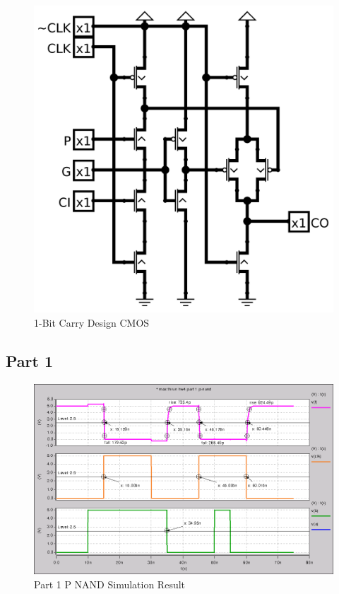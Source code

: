 \documentclass{article}
\begin{document}
\begin{figure}[H]
    \centering
    \includegraphics[width=\linewidth]{../logisim_carry_slice_fets.png}
    \caption{1-Bit Carry Design CMOS}
\end{figure}

\newpage
\subsection*{Part 1}






\begin{figure}[H]
    \centering
    \includegraphics[width=\linewidth]{../part_1_p_nand.png}
    \caption{Part 1 P NAND Simulation Result}
\end{figure}
\end{document}
